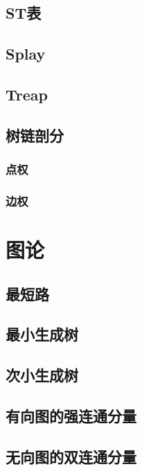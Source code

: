 \documentclass[12pt,a4paper]{article}
\begin{document}
\subsection{ST表}

\subsection{Splay}

\subsection{Treap}

\subsection{树链剖分}
\subsubsection{点权}
\begin{spacing}{1.5}

\end{spacing}

\subsubsection{边权}
\begin{spacing}{1.5}

\end{spacing}

\section{图论}
\subsection{最短路}
\subsection{最小生成树}
\subsection{次小生成树}
\subsection{有向图的强连通分量}
\subsection{无向图的双连通分量}
\end{document}
